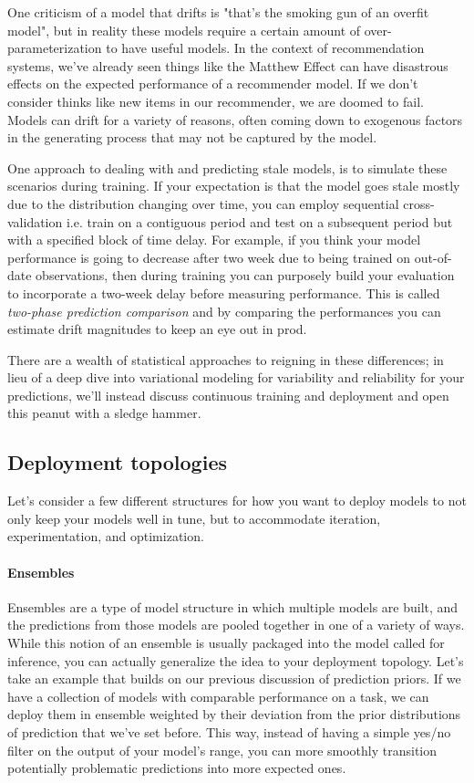 One criticism of a model that drifts is "that's the smoking gun of an overfit model", but in reality these models require a certain amount of over-parameterization to have useful models. In the context of recommendation systems, we've already seen things like the Matthew Effect can have disastrous effects on the expected performance of a recommender model. If we don't consider thinks like new items in our recommender, we are doomed to fail. Models can drift for a variety of reasons, often coming down to exogenous factors in the generating process that may not be captured by the model. 

One approach to dealing with and predicting stale models, is to simulate these scenarios during training. If your expectation is that the model goes stale mostly due to the distribution changing over time, you can employ sequential cross-validation \textemdash  i.e. train on a contiguous period and test on a subsequent period \textemdash but with a specified block of time delay. For example, if you think your model performance is going to decrease after two week due to being trained on out-of-date observations, then during training you can purposely build your evaluation to incorporate a two-week delay before measuring performance. This is called \emph{two-phase prediction comparison} and by comparing the performances you can estimate drift magnitudes to keep an eye out in prod. 

There are a wealth of statistical approaches to reigning in these differences; in lieu of a deep dive into variational modeling for variability and reliability for your predictions, we'll instead discuss continuous training and deployment and open this peanut with a sledge hammer.

\subsection{Deployment topologies}

Let's consider a few different structures for how you want to deploy models to not only keep your models well in tune, but to accommodate iteration, experimentation, and optimization.

\paragraph{Ensembles}

Ensembles are a type of model structure in which multiple models are built, and the predictions from those models are pooled together in one of a variety of ways. While this notion of an ensemble is usually packaged into the model called for inference, you can actually generalize the idea to your deployment topology. Let's take an example that builds on our previous discussion of prediction priors. If we have a collection of models with comparable performance on a task, we can deploy them in ensemble weighted by their deviation from the prior distributions of prediction that we've set before. This way, instead of having a simple yes/no filter on the output of your model's range, you can more smoothly transition potentially problematic predictions into more expected ones. 

